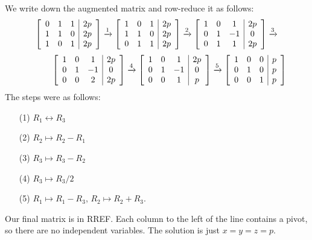 \documentclass[a4paper]{book}
\theoremstyle{definition}
\renewenvironment{solution}{\SolutionInline}{\endSolutionInline}
\begin{document}
\begin{solution}
 We write down the augmented matrix and row-reduce it as follows:
 {\small \[
  \left[\begin{array}{ccc|c}
    0 &  1 &  1 & 2p \\
    1 &  1 &  0 & 2p \\
    1 &  0 &  1 & 2p
  \end{array}\right]
  \xrightarrow{1}
  \left[\begin{array}{ccc|c}
    1 &  0 &  1 & 2p \\
    1 &  1 &  0 & 2p \\
    0 &  1 &  1 & 2p 
  \end{array}\right]
  \xrightarrow{2}
  \left[\begin{array}{ccc|c}
    1 &  0 &  1 & 2p \\
    0 &  1 & -1 & 0  \\
    0 &  1 &  1 & 2p 
  \end{array}\right]
  \xrightarrow{3}
  \] \[ \hspace{3em}
  \left[\begin{array}{ccc|c}
    1 &  0 &  1 & 2p \\
    0 &  1 & -1 & 0  \\
    0 &  0 &  2 & 2p 
  \end{array}\right]
  \xrightarrow{4}
  \left[\begin{array}{ccc|c}
    1 &  0 &  1 & 2p \\
    0 &  1 & -1 & 0  \\
    0 &  0 &  1 & p 
  \end{array}\right]
  \xrightarrow{5}
  \left[\begin{array}{ccc|c}
    1 &  0 &  0 & p \\
    0 &  1 &  0 & p \\
    0 &  0 &  1 & p 
  \end{array}\right]
 \]}
 The steps were as follows:
 \begin{itemize}
  \item[(1)] $R_1\leftrightarrow R_3$
  \item[(2)] $R_2\mapsto R_2-R_1$
  \item[(3)] $R_3\mapsto R_3-R_2$
  \item[(4)] $R_3\mapsto R_3/2$
  \item[(5)] $R_1\mapsto R_1-R_3$, $R_2\mapsto R_2+R_3$.
 \end{itemize}
 Our final matrix is in RREF.  Each column to the left of the line
 contains a pivot, so there are no independent variables.  The
 solution is just $x=y=z=p$.
\end{solution}
\end{document}
